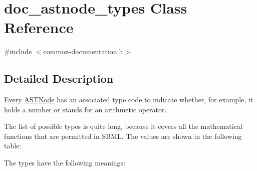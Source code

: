 \hypertarget{classdoc__astnode__types}{}\section{doc\+\_\+astnode\+\_\+types Class Reference}
\label{classdoc__astnode__types}


{\ttfamily \#include $<$common-\/documentation.\+h$>$}



\subsection{Detailed Description}
\begin{DoxyParagraph}{}
Every \hyperlink{class_a_s_t_node}{A\+S\+T\+Node} has an associated type code to indicate whether, for example, it holds a number or stands for an arithmetic operator.
\end{DoxyParagraph}
The list of possible types is quite long, because it covers all the mathematical functions that are permitted in S\+B\+ML. The values are shown in the following table\+:



The types have the following meanings\+:

